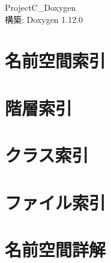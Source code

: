 \documentclass[twoside]{book}
\newcommand{\+}{\discretionary{\mbox{\scriptsize$\hookleftarrow$}}{}{}}
\newcommand{\clearemptydoublepage}{%
    \newpage{\pagestyle{empty}\cleardoublepage}%
  }
\begin{document}
  \raggedbottom
  \begin{CJK}{UTF8}{min}
    \hypersetup{pageanchor=false,
                bookmarksnumbered=true,
                pdfencoding=unicode
               }
  \begin{titlepage}
  \vspace*{7cm}
  \begin{center}%
  {\Large Project\+C\+\_\+\+Doxygen}\\
  \vspace*{1cm}
  {\large 構築\+: Doxygen 1.12.0}\\
  \end{center}
  \end{titlepage}
  \clearemptydoublepage
  \tableofcontents
  \clearemptydoublepage
  \hypersetup{pageanchor=true}
\chapter{名前空間索引}

\chapter{階層索引}

\chapter{クラス索引}

\chapter{ファイル索引}

\chapter{名前空間詳解}





















\end{CJK}
\end{document}
